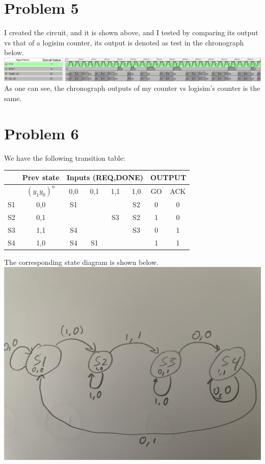 \documentclass[12pt]{article}
\begin{document}
\section*{Problem 5}
I created the circuit, and it is shown above, and I tested 
by comparing its output vs that of a logisim counter, its output is denoted
as test in the chronograph below.\\
\includegraphics[scale=0.2]{fig8.png}
As one can see, the chronograph outputs of my counter vs logisim's counter is the same.
\section*{Problem 6}

We have the following transition table:
\begin{center}
    \begin{tabular}{|c|c|c|c|c|c|c|c|}
    & Prev state& \multicolumn{4}{c}{Inputs (REQ,DONE)} & \multicolumn{2}{c}{OUTPUT} \\
    \hline
    & $(y_1y_0)^n$ &0,0 &0,1 &1,1 &1,0 & GO & ACK\\
    \hline
    S1 & 0,0 & S1 & & &S2 & 0 & 0\\
    \hline
    S2 & 0,1 & & &S3 &S2 & 1 & 0\\
    \hline
    S3 & 1,1 &S4 & & &S3 & 0 & 1\\
    \hline
    S4 & 1,0 &S4 & S1& & &1 & 1\\       
    \end{tabular}

\end{center}
The corresponding state diagram is shown below.\\
\includegraphics[scale=.075]{fig11.jpg}
\end{document}

